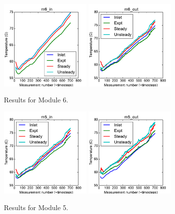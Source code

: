 \documentclass{article}
\begin{document}
\begin{figure}[!ht]
\centering
\includegraphics[width=0.4\textwidth]{../../data/ICSolar/images/Feb11_m6_in_compare.pdf}\hspace{0.05\textwidth}
\includegraphics[width=0.4\textwidth]{../../data/ICSolar/images/Feb11_m6_out_compare.pdf}\hspace{0.05\textwidth}\\
\caption{Results for Module 6.}\end{figure}
\begin{figure}[!ht]
\centering
\includegraphics[width=0.4\textwidth]{../../data/ICSolar/images/Feb11_m5_in_compare.pdf}\hspace{0.05\textwidth}
\includegraphics[width=0.4\textwidth]{../../data/ICSolar/images/Feb11_m5_out_compare.pdf}\hspace{0.05\textwidth}\\
\caption{Results for Module 5.}\end{figure}
\end{document}
